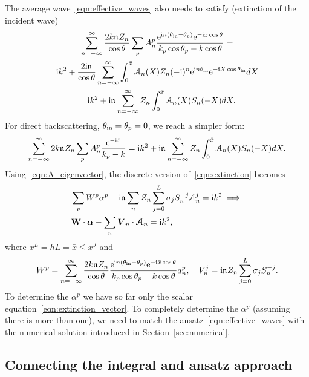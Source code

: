 \documentclass[12pt, a4paper]{article}
\begin{document}
 The average wave~\eqref{eqn:effective_waves} also needs to satisfy (extinction of the incident wave)
 \begin{multline}
 \sum_{n=-\infty}^\infty \frac{2 k \mathfrak n_{} Z_n}{\cos \theta}  \sum_{p}
  A_n^p  \frac{\textrm{e}^{\textrm{i} n (\theta_{\mathrm{in}} - \theta_p)} \textrm{e}^{ - \textrm{i} \bar x  \cos \theta}}{k_p \cos \theta_p - k \cos \theta}
   = \\
 \textrm{i} k^2 +  \frac{2\textrm{i} \mathfrak n_{}}{\cos \theta} \sum_{n=-\infty}^\infty \int_{0}^{{\bar x}}
     \mathcal A_n(X) Z_n (-\textrm{i})^{n} \textrm{e}^{\textrm{i} n \theta_{\mathrm{in}}} \textrm{e}^{-\textrm{i} X \cos \theta_{\mathrm{in}}}  d X
     \\
   = \textrm{i} k^2 +
   \textrm{i} \mathfrak n_{} \sum_{n=-\infty}^\infty Z_n \int_{0}^{{\bar x}}
     \mathcal A_n(X) S_n(-X) d X.
     \label{eqn:extinction}
 \end{multline}
 For direct backscattering, $\theta_{\mathrm{in}} = \theta_p =0$, we reach a simpler form:
 \begin{equation}
 \sum_{n=-\infty}^\infty 2 k \mathfrak n_{} Z_n  \sum_{p}
  A_n^p  \frac{\textrm{e}^{- \textrm{i} \bar x}}{k_p  - k }
   = \textrm{i} k^2 +
   \textrm{i} \mathfrak n_{} \sum_{n=-\infty}^\infty Z_n \int_{0}^{{\bar x}}
     \mathcal A_n(X) S_n(-X) d X.
 \end{equation}
 Using~\eqref{eqn:A_eigenvector}, the discrete version of~\eqref{eqn:extinction} becomes
 \begin{align}
   &   \sum_p   W^p  \alpha^p - \textrm{i} \mathfrak n_{} \sum_n Z_n \sum_{j=0}^L \sigma_j S^{-j}_n \mathcal A_n^j  =
   \textrm{i} k^2 \implies   \\ &
    \mathbf W \cdot \boldsymbol{\alpha} - \sum_n \boldsymbol{V}_n \cdot \boldsymbol{\mathcal A}_n =
    \textrm{i} k^2,
    \label{eqn:extinction_vector}
 \end{align}
 where $x^L = h L = \bar x \leq x^J$ and
 \begin{equation}
   W^p  = \sum_{n=-\infty}^\infty \frac{2 k \mathfrak n_{} Z_n}{\cos \theta}
     \frac{\textrm{e}^{\textrm{i} n (\theta_{\mathrm{in}} - \theta_p)} \textrm{e}^{- \textrm{i} \bar x  \cos \theta}}{k_p \cos \theta_p - k \cos \theta} a_n^p,  \quad
    V_n^j =  \textrm{i} \mathfrak n_{} Z_n \sum_{j=0}^L \sigma_j S^{-j}_n.
    \label{eqn:extinction_matrix}
 \end{equation}
To determine the $\alpha^p$ we have so far only the scalar equation~\eqref{eqn:extinction_vector}. To completely determine the $\alpha^p$ (assuming there is more than one), we need to match the ansatz~\eqref{eqn:effective_waves} with the numerical solution introduced in Section~\ref{sec:numerical}.


\subsection{Connecting the integral and ansatz approach}
\end{document}
